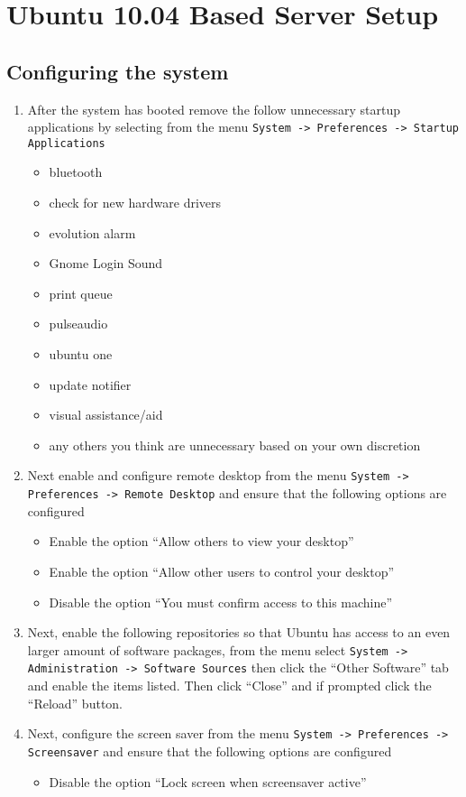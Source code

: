\section{Ubuntu 10.04 Based Server Setup}
\subsection{Configuring the system}
\label{sec:ubuntuconfig}
\begin{enumerate}
\item	After the system has booted remove the follow unnecessary startup applications by selecting from the menu  
		\verb|System -> Preferences -> Startup Applications|
\begin{itemize}
\item	bluetooth
\item	check for new hardware drivers
\item	evolution alarm
\item	Gnome Login Sound
\item	print queue
\item	pulseaudio
\item	ubuntu one
\item	update notifier
\item	visual assistance/aid
\item	any others you think are unnecessary based on your own discretion
\end{itemize}

\item Next enable and configure remote desktop from the menu \verb|System -> Preferences -> Remote Desktop| and ensure
that the following options are configured
\begin{itemize}
\item	Enable the option ``Allow others to view your desktop''
\item	Enable the option ``Allow other users to control your desktop''
\item	Disable the option ``You must confirm access to this machine''
\end{itemize}

\item 	Next, enable the following repositories so that Ubuntu has access to an even larger amount of software packages, from the
		menu select \verb|System -> Administration -> Software Sources| then click the ``Other Software'' tab and enable the items
		listed. Then click ``Close'' and if prompted click the ``Reload'' button. 

\item 	Next, configure the screen saver from the menu \verb|System -> Preferences -> Screensaver| and ensure that the following options
		are configured
\begin{itemize}
\item	Disable the option ``Lock screen when screensaver active''
\end{itemize}


\end{enumerate}
